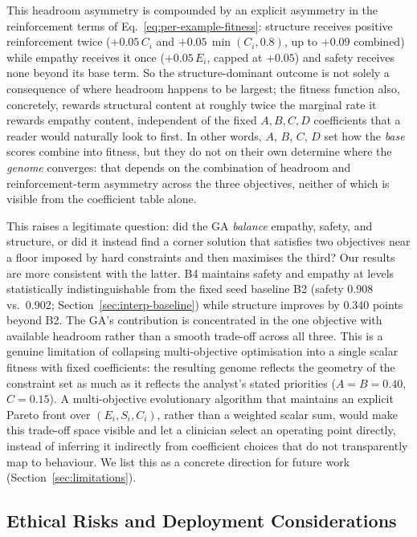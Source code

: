 \documentclass[mathematics,article,xetex,moreauthors]{Definitions/mdpi}
\begin{document}
This headroom asymmetry is compounded by an explicit asymmetry in the
reinforcement terms of Eq.~\eqref{eq:per-example-fitness}: structure receives
positive reinforcement twice ($+0.05\,C_i$ and $+0.05\,\min(C_i,0.8)$, up to
$+0.09$ combined) while empathy receives it once ($+0.05\,E_i$, capped at
$+0.05$) and safety receives none beyond its base term. So the
structure-dominant outcome is not solely a consequence of where headroom
happens to be largest; the fitness function also, concretely, rewards
structural content at roughly twice the marginal rate it rewards empathy
content, independent of the fixed $A,B,C,D$ coefficients that a reader would
naturally look to first. In other words, $A$, $B$, $C$, $D$ set how the
\emph{base} scores combine into fitness, but they do not on their own
determine where the \emph{genome} converges: that depends on the combination
of headroom and reinforcement-term asymmetry across the three objectives,
neither of which is visible from the coefficient table alone.

This raises a legitimate question: did the GA \emph{balance} empathy, safety,
and structure, or did it instead find a corner solution that satisfies two
objectives near a floor imposed by hard constraints and then maximises the
third? Our results are more consistent with the latter. B4 maintains safety
and empathy at levels statistically indistinguishable from the fixed seed
baseline B2 (safety 0.908 vs.\ 0.902; Section~\ref{sec:interp-baseline})
while structure improves by 0.340 points beyond B2. The GA's contribution
is concentrated in the one objective with available headroom rather than a
smooth trade-off across all three. This is a genuine limitation of collapsing
multi-objective optimisation into a single scalar fitness with fixed
coefficients: the resulting genome reflects the geometry of the constraint
set as much as it reflects the analyst's stated priorities ($A=B=0.40$,
$C=0.15$). A multi-objective evolutionary algorithm that maintains an
explicit Pareto front over $(E_i, S_i, C_i)$, rather than a weighted scalar
sum, would make this trade-off space visible and let a clinician select an
operating point directly, instead of inferring it indirectly from coefficient
choices that do not transparently map to behaviour. We list this as a
concrete direction for future work (Section~\ref{sec:limitations}).

\subsection{Ethical Risks and Deployment Considerations}
\label{sec:ethics}
\end{document}
